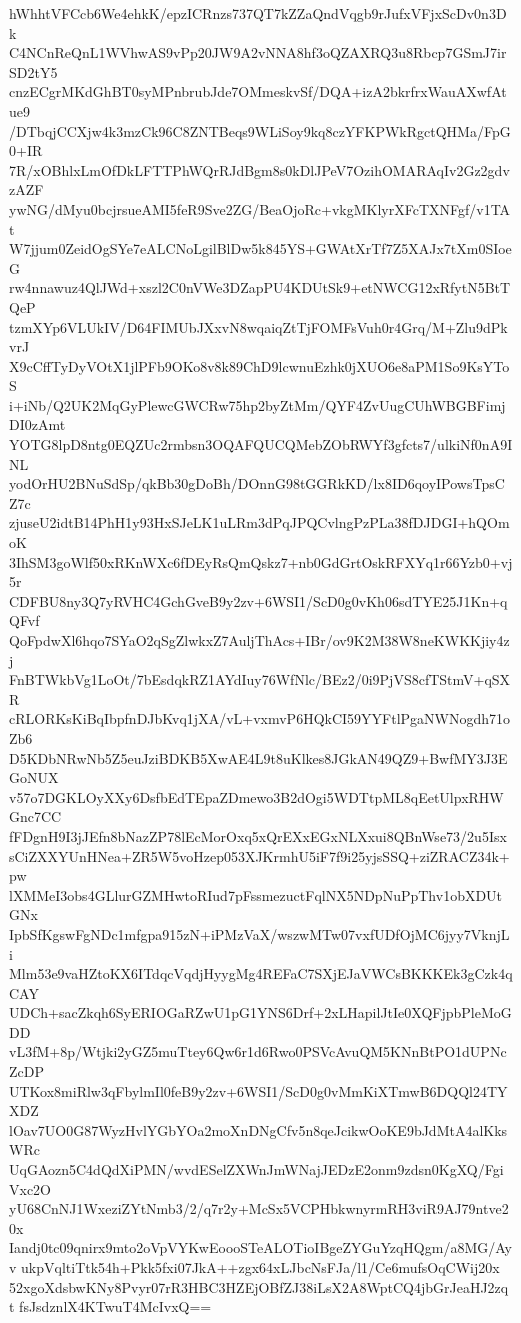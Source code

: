 hWhhtVFCcb6We4ehkK/epzICRnzs737QT7kZZaQndVqgb9rJufxVFjxScDv0n3Dk
C4NCnReQnL1WVhwAS9vPp20JW9A2vNNA8hf3oQZAXRQ3u8Rbcp7GSmJ7irSD2tY5
cnzECgrMKdGhBT0syMPnbrubJde7OMmeskvSf/DQA+izA2bkrfrxWauAXwfAtue9
/DTbqjCCXjw4k3mzCk96C8ZNTBeqs9WLiSoy9kq8czYFKPWkRgctQHMa/FpG0+IR
7R/xOBhlxLmOfDkLFTTPhWQrRJdBgm8s0kDlJPeV7OzihOMARAqIv2Gz2gdvzAZF
ywNG/dMyu0bcjrsueAMI5feR9Sve2ZG/BeaOjoRc+vkgMKlyrXFcTXNFgf/v1TAt
W7jjum0ZeidOgSYe7eALCNoLgilBlDw5k845YS+GWAtXrTf7Z5XAJx7tXm0SIoeG
rw4nnawuz4QlJWd+xszl2C0nVWe3DZapPU4KDUtSk9+etNWCG12xRfytN5BtTQeP
tzmXYp6VLUkIV/D64FIMUbJXxvN8wqaiqZtTjFOMFsVuh0r4Grq/M+Zlu9dPkvrJ
X9cCffTyDyVOtX1jlPFb9OKo8v8k89ChD9lcwnuEzhk0jXUO6e8aPM1So9KsYToS
i+iNb/Q2UK2MqGyPlewcGWCRw75hp2byZtMm/QYF4ZvUugCUhWBGBFimjDI0zAmt
YOTG8lpD8ntg0EQZUc2rmbsn3OQAFQUCQMebZObRWYf3gfcts7/ulkiNf0nA9INL
yodOrHU2BNuSdSp/qkBb30gDoBh/DOnnG98tGGRkKD/lx8ID6qoyIPowsTpsCZ7c
zjuseU2idtB14PhH1y93HxSJeLK1uLRm3dPqJPQCvlngPzPLa38fDJDGI+hQOmoK
3IhSM3goWlf50xRKnWXc6fDEyRsQmQskz7+nb0GdGrtOskRFXYq1r66Yzb0+vj5r
CDFBU8ny3Q7yRVHC4GchGveB9y2zv+6WSI1/ScD0g0vKh06sdTYE25J1Kn+qQFvf
QoFpdwXl6hqo7SYaO2qSgZlwkxZ7AuljThAcs+IBr/ov9K2M38W8neKWKKjiy4zj
FnBTWkbVg1LoOt/7bEsdqkRZ1AYdIuy76WfNlc/BEz2/0i9PjVS8cfTStmV+qSXR
cRLORKsKiBqIbpfnDJbKvq1jXA/vL+vxmvP6HQkCI59YYFtlPgaNWNogdh71oZb6
D5KDbNRwNb5Z5euJziBDKB5XwAE4L9t8uKlkes8JGkAN49QZ9+BwfMY3J3EGoNUX
v57o7DGKLOyXXy6DsfbEdTEpaZDmewo3B2dOgi5WDTtpML8qEetUlpxRHWGnc7CC
fFDgnH9I3jJEfn8bNazZP78lEcMorOxq5xQrEXxEGxNLXxui8QBnWse73/2u5Isx
sCiZXXYUnHNea+ZR5W5voHzep053XJKrmhU5iF7f9i25yjsSSQ+ziZRACZ34k+pw
lXMMeI3obs4GLlurGZMHwtoRIud7pFssmezuctFqlNX5NDpNuPpThv1obXDUtGNx
IpbSfKgswFgNDc1mfgpa915zN+iPMzVaX/wszwMTw07vxfUDfOjMC6jyy7VknjLi
Mlm53e9vaHZtoKX6ITdqcVqdjHyygMg4REFaC7SXjEJaVWCsBKKKEk3gCzk4qCAY
UDCh+sacZkqh6SyERIOGaRZwU1pG1YNS6Drf+2xLHapilJtIe0XQFjpbPleMoGDD
vL3fM+8p/Wtjki2yGZ5muTtey6Qw6r1d6Rwo0PSVcAvuQM5KNnBtPO1dUPNcZcDP
UTKox8miRlw3qFbylmIl0feB9y2zv+6WSI1/ScD0g0vMmKiXTmwB6DQQl24TYXDZ
lOav7UO0G87WyzHvlYGbYOa2moXnDNgCfv5n8qeJcikwOoKE9bJdMtA4alKksWRc
UqGAozn5C4dQdXiPMN/wvdESelZXWnJmWNajJEDzE2onm9zdsn0KgXQ/FgiVxc2O
yU68CnNJ1WxeziZYtNmb3/2/q7r2y+McSx5VCPHbkwnyrmRH3viR9AJ79ntve20x
Iandj0tc09qnirx9mto2oVpVYKwEoooSTeALOTioIBgeZYGuYzqHQgm/a8MG/Ayv
ukpVqltiTtk54h+Pkk5fxi07JkA++zgx64xLJbcNsFJa/l1/Ce6mufsOqCWij20x
52xgoXdsbwKNy8Pvyr07rR3HBC3HZEjOBfZJ38iLsX2A8WptCQ4jbGrJeaHJ2zqt
fsJsdznlX4KTwuT4McIvxQ==
